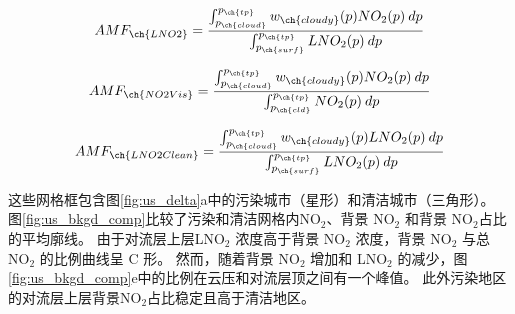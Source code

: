 \begin{equation} \label{AMFLNO2_crf100}
AMF_{\ch{LNO2}} = \frac{\int_{p_{\ch{cloud}}}^{p_{\ch{tp}}} w_{\ch{cloudy}}(p) NO_2(p) \: dp}{\int_{p_{\ch{surf}}}^{p_{\ch{tp}}} LNO_2(p) \: dp}
\end{equation}

\begin{equation} \label{AMFNO2Vis_crf100}
AMF_{\ch{NO2Vis}} = \frac{\int_{p_{\ch{cloud}}}^{p_{\ch{tp}}} w_{\ch{cloudy}}(p) NO_2(p) \: dp}{\int_{p_{\ch{cld}}}^{p_{\ch{tp}}} NO_2(p) \: dp}
\end{equation}

\begin{equation} \label{AMFLNO2Clean_crf100}
AMF_{\ch{LNO2Clean}} = \frac{\int_{p_{\ch{cloud}}}^{p_{\ch{tp}}} w_{\ch{cloudy}}(p) LNO_2(p) \: dp}{\int_{p_{\ch{surf}}}^{p_{\ch{tp}}} LNO_2(p) \: dp}
\end{equation}

这些网格框包含图\ref{fig:us_delta}a中的污染城市（星形）和清洁城市（三角形）。
图\ref{fig:us_bkgd_comp}比较了污染和清洁网格内NO$_2$、背景 NO$_2$ 和背景 NO$_2$占比的平均廓线。
由于对流层上层LNO$_2$ 浓度高于背景 NO$_2$ 浓度，背景 NO$_2$ 与总 NO$_2$ 的比例曲线呈 C 形。
然而，随着背景 NO$_2$ 增加和 LNO$_2$ 的减少，图\ref{fig:us_bkgd_comp}e中的比例在云压和对流层顶之间有一个峰值。
此外污染地区的对流层上层背景NO$_2$占比稳定且高于清洁地区。

